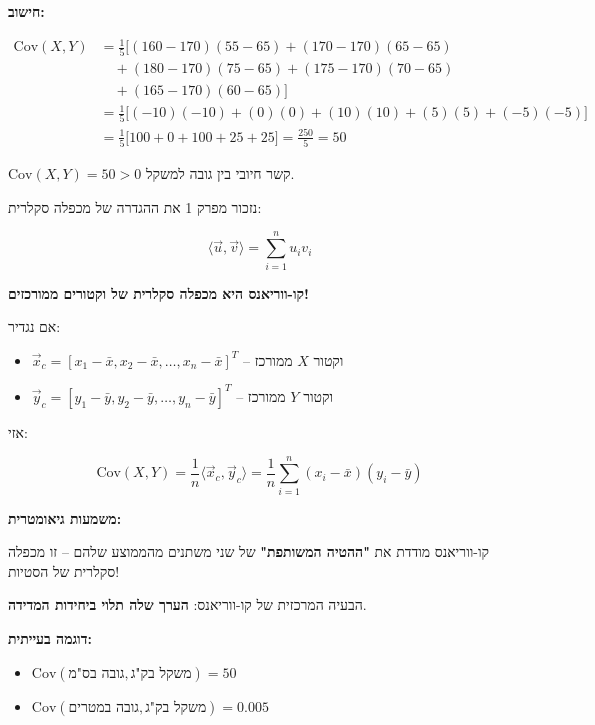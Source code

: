 \textbf{חישוב:}

\begin{align}
\text{Cov}(X,Y) &= \frac{1}{5}\big[(160-170)(55-65) + (170-170)(65-65) \nonumber \\
&\quad + (180-170)(75-65) + (175-170)(70-65) \nonumber \\
&\quad + (165-170)(60-65)\big] \nonumber \\
&= \frac{1}{5}\big[(-10)(-10) + (0)(0) + (10)(10) + (5)(5) + (-5)(-5)\big] \nonumber \\
&= \frac{1}{5}\big[100 + 0 + 100 + 25 + 25\big] = \frac{250}{5} = 50
\end{align}

$\text{Cov}(X,Y) = 50 > 0$ \rarrow{} קשר חיובי בין גובה למשקל.


נזכור מפרק \num{1} את ההגדרה של מכפלה סקלרית:

\begin{equation}
\langle \vec{u}, \vec{v} \rangle = \sum_{i=1}^{n} u_i v_i
\end{equation}

\textbf{קו-ווריאנס היא מכפלה סקלרית של וקטורים ממורכזים!}

אם נגדיר:
\begin{itemize}
\item $\vec{x}_c = [x_1 - \bar{x}, x_2 - \bar{x}, \ldots, x_n - \bar{x}]^T$ – וקטור $X$ ממורכז
\item $\vec{y}_c = [y_1 - \bar{y}, y_2 - \bar{y}, \ldots, y_n - \bar{y}]^T$ – וקטור $Y$ ממורכז
\end{itemize}

אזי:

\begin{equation}
\text{Cov}(X, Y) = \frac{1}{n} \langle \vec{x}_c, \vec{y}_c \rangle = \frac{1}{n} \sum_{i=1}^{n} (x_i - \bar{x})(y_i - \bar{y})
\end{equation}

\textbf{משמעות גיאומטרית:}

קו-ווריאנס מודדת את \textbf{"ההטיה המשותפת"} של שני משתנים מהממוצע שלהם – זו מכפלה סקלרית של הסטיות!


הבעיה המרכזית של קו-ווריאנס: \textbf{הערך שלה תלוי ביחידות המדידה}.

\textbf{דוגמה בעייתית:}

\begin{itemize}
\item $\text{Cov}(\text{גובה בס"מ}, \text{משקל בק"ג}) = 50$
\item $\text{Cov}(\text{גובה במטרים}, \text{משקל בק"ג}) = 0.005$
\end{itemize}

